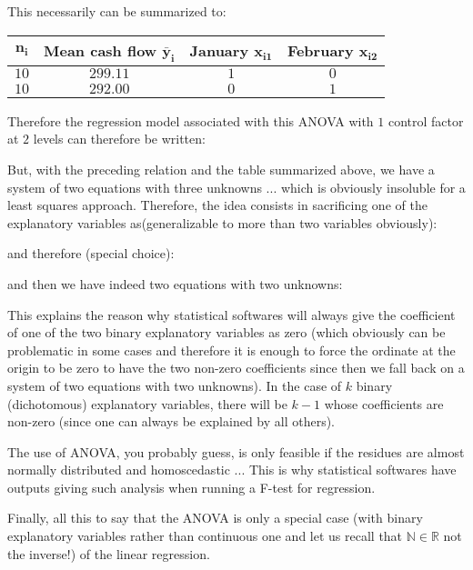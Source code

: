 	This necessarily can be summarized to:
	\begin{table}[H]
	\centering
			\begin{tabular}{|c|c|c|c|}
				\hline
				\cellcolor{black!30}\textbf{$\pmb{n_i}$} & \cellcolor{black!30}\textbf{Mean cash flow $\pmb{\bar{y}_i}$} & \cellcolor{black!30}\textbf{January $\pmb{x_{i1}}$} & \cellcolor{black!30}\textbf{February $\pmb{x_{i2}}$} \\ \hline
				$10$ & $299.11$ & $1$ & $0$ \\ \hline
				$10$ & $292.00$ & $0$ & $1$ \\ \hline
		\end{tabular}
	\end{table}
	Therefore the regression model associated with this ANOVA with $1$ control factor at $2$ levels can therefore be written:
	
	But, with the preceding relation and the table summarized above, we have a system of two equations with three unknowns ... which is obviously insoluble for a least squares approach. Therefore, the idea consists in sacrificing one of the explanatory variables as(generalizable to more than two variables obviously):
	
	and therefore (special choice):
	
	and then we have indeed two equations with two unknowns:
	
	This explains the reason why statistical softwares will always give the coefficient of one of the two binary explanatory variables as zero (which obviously can be problematic in some cases and therefore it is enough to force the ordinate at the origin to be zero to have the two non-zero coefficients since then we fall back on a system of two equations with two unknowns). In the case of $k$ binary (dichotomous) explanatory variables, there will be $k - 1$ whose coefficients are non-zero (since one can always be explained by all others).
	\begin{tcolorbox}[title=Remark,colframe=black,arc=10pt]
	The use of ANOVA, you probably guess, is only feasible if the residues are almost normally distributed and homoscedastic ... This is why statistical softwares have outputs giving such analysis when running a F-test for regression. 
	\end{tcolorbox}
	Finally, all this to say that the ANOVA is only a special case (with binary explanatory variables rather than continuous one and let us recall that $\mathbb{N}\in\mathbb{R}$ not the inverse!) of the linear regression.

